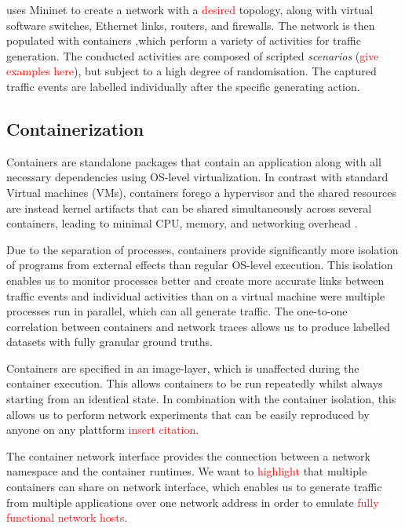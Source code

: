 \documentclass[sigconf]{acmart}
\begin{document}
uses Mininet to create a network with a \textcolor{red}{desired} topology, along with virtual software switches, Ethernet links, routers, and firewalls. The network is then populated with containers ,which perform a variety of activities for traffic generation. The conducted activities are composed of scripted \textit{scenarios} (\textcolor{red}{give examples here}), but subject to a high degree of randomisation. The captured traffic events are labelled individually after the specific generating action. 

\subsection{Containerization}
Containers are standalone packages that contain an application along with all necessary dependencies using OS-level virtualization. In contrast with standard Virtual machines (VMs), containers forego a hypervisor and the shared resources are instead kernel artifacts that can be shared simultaneously across several containers, leading to minimal CPU, memory, and networking overhead \cite{kolyshkin2006virtualization}.



Due to the separation of processes, containers provide significantly more isolation of programs from external effects than regular OS-level execution. This isolation enables us to monitor processes better and create more accurate links between traffic events and individual activities than on a virtual machine were multiple processes run in parallel, which can all generate traffic. The one-to-one correlation between containers and network traces allows us to produce labelled datasets with fully granular ground truths. 

Containers are specified in an image-layer, which is unaffected during the container execution.
This allows containers to be run repeatedly whilst always starting from an identical state. In combination with the container isolation, this allows us to perform network experiments that can be easily reproduced by anyone on any plattform \textcolor{red}{insert citation}. 


The container network interface provides the connection between a network namespace and the container runtimes. We want to \textcolor{red}{highlight} that multiple containers can share on network interface, which enables us to generate traffic from multiple applications over one network address in order to emulate \textcolor{red}{fully functional network hosts}.
 
\end{document}
